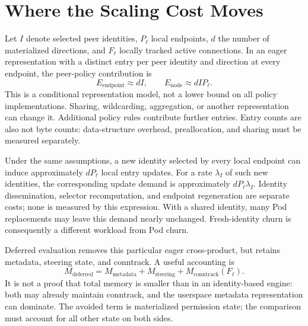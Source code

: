 \documentclass[letterpaper,twocolumn,10pt]{article}
\begin{document}
\section{Where the Scaling Cost Moves}
\label{sec:model}
Let $I$ denote selected peer identities, $P_{\ell}$ local endpoints,
$d$ the number of materialized directions, and $F_{\ell}$ locally tracked
active connections. In an eager representation with a distinct entry
per peer identity and direction at every endpoint, the peer-policy
contribution is
\begin{equation}
E_{\mathrm{endpoint}} \approx dI,\qquad
E_{\mathrm{node}} \approx dIP_{\ell}.
\label{eq:materialization}
\end{equation}
This is a conditional representation model, not a lower bound on all
policy implementations. Sharing, wildcarding, aggregation, or another
representation can change it. Additional policy rules contribute further
entries. Entry counts are also not byte counts: data-structure overhead,
preallocation, and sharing must be measured separately.

Under the same assumptions, a new identity selected by every local
endpoint can induce approximately $dP_{\ell}$ local entry updates. For
a rate $\lambda_I$ of such new identities, the corresponding update
demand is approximately $dP_{\ell}\lambda_I$. Identity dissemination,
selector recomputation, and endpoint regeneration are separate costs;
none is measured by this expression. With a shared identity, many Pod
replacements may leave this demand nearly unchanged. Fresh-identity
churn is consequently a different workload from Pod churn.

Deferred evaluation removes this particular eager cross-product, but
retains metadata, steering state, and conntrack. A useful accounting is
\begin{equation}
M_{\mathrm{deferred}} = M_{\mathrm{metadata}} +
M_{\mathrm{steering}} + M_{\mathrm{conntrack}}(F_{\ell}).
\end{equation}
It is not a proof that total memory is smaller than in an identity-based
engine: both may already maintain conntrack, and the userspace metadata
representation can dominate. The avoided term is materialized permission
state; the comparison must account for all other state on both sides.
\end{document}
